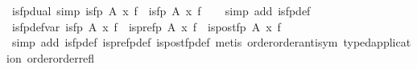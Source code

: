 \begin{isabellebody}
\isanewline
{}\isamarkupfalse%
\ is{}fp{}dual\ {}simp{}{}\ {}is{}fp\ {}A{}{}\ x\ f\ {}\ is{}fp\ A\ x\ f{}\isanewline
%
\isadelimproof
\ \ %
\endisadelimproof
%
\isatagproof
{}\isamarkupfalse%
\ {}simp\ add{}\ is{}fp{}def{}%
\endisatagproof
{\isafoldproof}%
%
\isadelimproof
\isanewline
%
\endisadelimproof
\isanewline
{}\isamarkupfalse%
\ is{}fp{}def{}var{}\ {}is{}fp\ A\ x\ f\ {}\ {}is{}pre{}fp\ A\ x\ f\ {}\ is{}post{}fp\ A\ x\ f{}{}\isanewline
%
\isadelimproof
\ \ %
\endisadelimproof
%
\isatagproof
{}\isamarkupfalse%
\ {}simp\ add{}\ is{}fp{}def\ is{}pre{}fp{}def\ is{}post{}fp{}def{}\ metis\ order{}order{}antisym\ typed{}application\ order{}order{}refl{}%
\endisatagproof
{\isafoldproof}%
%
\isadelimproof
\isanewline
%
\endisadelimproof
\isanewline
{}\isamarkupfalse%

\end{isabellebody}
